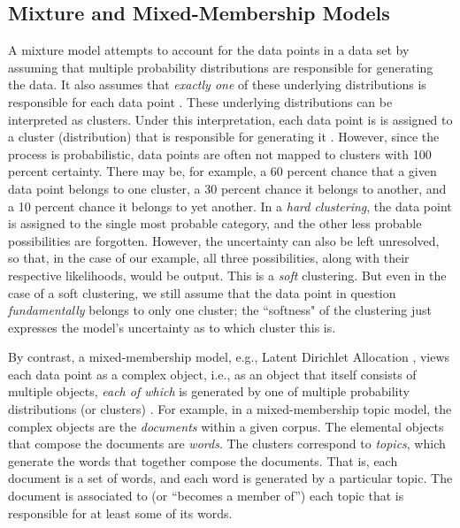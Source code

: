 \subsection{Mixture and Mixed-Membership Models}
\label{sec:mixture-models}
A mixture model attempts to account for the data points in a data set 
by assuming that multiple probability
distributions are responsible for generating the data. 
It also assumes that \emph{exactly one}
of these underlying distributions is responsible for each data point \citep{bishop:2006}. 
 These underlying 
distributions can be interpreted as clusters. Under this interpretation, each data point is 
is assigned to a cluster (distribution) that is responsible for generating it \citep{fraley:1998}. 
However, since the process is probabilistic,
data points are often not mapped to clusters with 100 percent certainty. 
There may be, for example, a 60 percent chance that a given data point belongs to one 
cluster, a 30 percent chance it belongs to another, and a 10 percent chance 
it belongs to yet another. In a \emph{hard clustering}, the data point is 
assigned to the single most probable category, and the other less probable 
possibilities are forgotten. However, the uncertainty can also be left 
unresolved, so that, in the case of our example, all three possibilities, 
along with their respective likelihoods, would be output. This is a 
\emph{soft} clustering. But even in the case of a soft clustering, 
we still assume that the data point in question \emph{fundamentally} belongs to only one cluster; 
the ``softness" of the clustering just expresses the model's uncertainty 
as to which cluster this is. %

By contrast, a mixed-membership model, e.g., Latent Dirichlet Allocation \citep{blei-et-al:2003},
views each data point as a complex object, i.e., as an object that itself consists of multiple objects, 
\emph{each of which} is generated by one of multiple probability distributions (or clusters) \citep{airoldi-et-al:2014}. 
For example, in a mixed-membership topic model, the complex objects are the 
\emph{documents} within a given corpus. The elemental objects that compose 
the documents are \emph{words}. The clusters correspond to \emph{topics}, which generate 
the words that together compose the documents. That is, each document is a set of words, and each 
word is generated by a particular topic. The document is associated to 
(or ``becomes a member of'') each topic that is
responsible for at least some of its words. 

